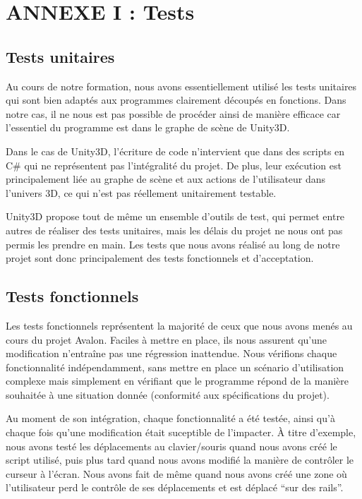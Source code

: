 \section{ANNEXE I : Tests}

\subsection{Tests unitaires}
Au cours de notre formation, nous avons essentiellement utilisé les tests unitaires qui sont bien adaptés aux programmes clairement découpés en fonctions.
Dans notre cas, il ne nous est pas possible de procéder ainsi de manière efficace car l'essentiel du programme est dans le graphe de scène de Unity3D. \newline

Dans le cas de Unity3D, l'écriture de code n'intervient que dans des scripts en C\# qui ne représentent pas l'intégralité du projet. De plus, leur exécution est principalement liée au graphe de scène et aux actions de l'utilisateur dans l'univers 3D, ce qui n'est pas réellement unitairement testable.\newline

Unity3D propose tout de même un ensemble d'outils de test, qui permet entre autres de réaliser des tests unitaires, mais les délais du projet ne nous ont pas permis les prendre en main. Les tests que nous avons réalisé au long de notre projet sont donc principalement des tests fonctionnels et d'acceptation. 

\subsection{Tests fonctionnels}
Les tests fonctionnels représentent la majorité de ceux que nous avons menés au cours du projet Avalon. Faciles à mettre en place, ils nous assurent qu'une modification n'entraîne pas une régression inattendue. Nous vérifions chaque fonctionnalité indépendamment, sans mettre en place un scénario d'utilisation complexe mais simplement en vérifiant que le programme répond de la manière souhaitée à une situation donnée (conformité aux spécifications du projet).\newline

Au moment de son intégration, chaque fonctionnalité a été testée, ainsi qu'à chaque fois qu'une modification était suceptible de l'impacter. À titre d'exemple, nous avons testé les déplacements au clavier/souris quand nous avons créé le script utilisé, puis plus tard quand nous avons modifié la manière de contrôler le curseur à l'écran. Nous avons fait de même quand nous avons créé une zone où l'utilisateur perd le contrôle de ses déplacements et est déplacé \enquote{sur des rails}.\newline

